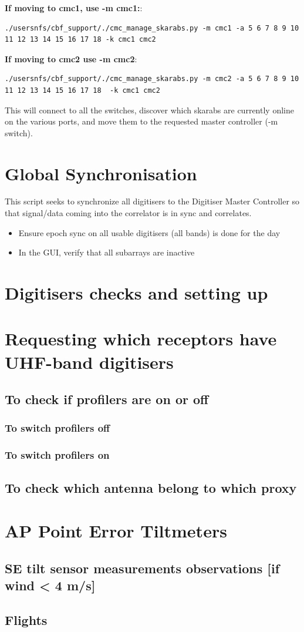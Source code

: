 \textbf{If moving to cmc1, use -m cmc1:}:
\begin{lstlisting}[style=DOS]
./usersnfs/cbf_support/./cmc_manage_skarabs.py -m cmc1 -a 5 6 7 8 9 10 11 12 13 14 15 16 17 18 -k cmc1 cmc2
\end{lstlisting}
\textbf{If moving to cmc2 use -m cmc2}:
\begin{lstlisting}[style=DOS]
./usersnfs/cbf_support/./cmc_manage_skarabs.py -m cmc2 -a 5 6 7 8 9 10 11 12 13 14 15 16 17 18  -k cmc1 cmc2
\end{lstlisting}




This will connect to all the switches, discover which skarabs are currently online on the various ports, and move them to the requested master controller (-m switch).



\section{Global Synchronisation}

This script seeks to synchronize all digitisers to the Digitiser Master Controller so that signal/data coming into the correlator is in sync and correlates. 
\begin{itemize}
\item{} Ensure epoch sync on all usable digitisers (all bands) is done for the day
\item{} In the GUI, verify that all subarrays are inactive
\end{itemize}

\section{Digitisers checks and setting up }
\section{Requesting which receptors have UHF-band digitisers}


\subsection{To check if profilers are on or off}
\subsubsection{To switch profilers off}
\subsubsection{To switch profilers on}
\subsection{To check which antenna belong to which proxy}
\section{AP Point Error Tiltmeters}
\subsection{SE tilt sensor measurements observations [if wind < 4 m/s]}
\subsection{Flights}



	